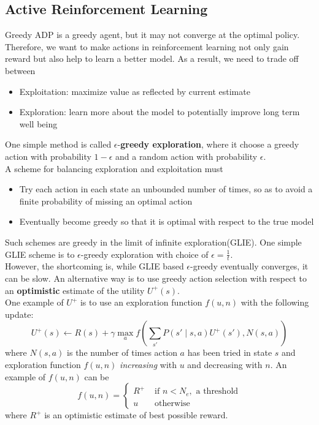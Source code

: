 \documentclass[12pt]{article}
\theoremstyle{definition}
\begin{document}
\subsection{Active Reinforcement Learning}
Greedy ADP is a greedy agent, but it may not converge at the optimal policy. Therefore, we want to make actions in reinforcement learning not only gain reward but also help to learn a better model. As a result, we need to trade off between
\begin{itemize}
	\item Exploitation: maximize value as reflected by current estimate
	\item Exploration: learn more about the model to potentially improve long term well being
\end{itemize}
One simple method is called $\epsilon$-\textbf{greedy exploration}, where it choose a greedy action with probability $1-\epsilon$ and a random action with probability $\epsilon$.\\
A scheme for balancing exploration and exploitation must
\begin{itemize}
\item Try each action in each state an unbounded number of times, so as to avoid a finite probability of missing an optimal action
\item Eventually become greedy so that it is optimal with respect to the true model
\end{itemize}
Such schemes are greedy in the limit of infinite exploration(GLIE). One simple GLIE scheme is to $\epsilon$-greedy exploration with choice of $\epsilon=\frac{1}{t}$.\\
However, the shortcoming is, while GLIE based $\epsilon$-greedy eventually converges, it can be slow. An alternative way is to use greedy action selection with respect to an \textbf{optimistic} estimate of the utility $U^{+}(s)$. \\
One example of $U^{+}$ is to use an exploration function $f(u,n)$ with the following update:
\[
U^{+}(s)\leftarrow R(s)+\gamma \max_a f(\sum_{s'}P(s'\mid s,a)U^{+}(s'), N(s,a))
\]
where $N(s,a)$ is the number of times action $a$ has been tried in state $s$ and exploration function $f(u,n)$ \textit{increasing} with $u$ and decreasing with $n$. 
An example of $f(u,n)$ can be
\[
f(u,n)=\begin{cases} R^{+} & \text{ if }n<N_e,\text{ a threshold}\\ u &\text{ otherwise}\end{cases}
\]
where $R^{+}$ is an optimistic estimate of best possible reward.
\end{document}
